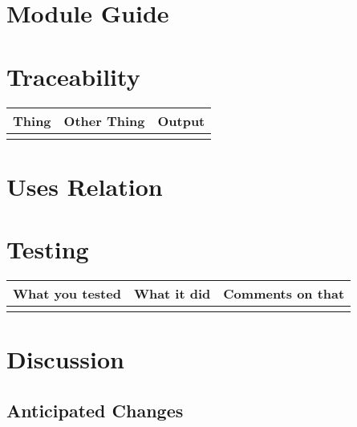 \documentclass[12pt]{article}
\begin{document}
		\section{Module Guide}
		\section{Traceability}
		\begin{tabular}{|c|c|c|}
			Thing & Other Thing & Output \\
			\hline \\
			
		\end{tabular}
		\section{Uses Relation}
		
		\section{Testing}
		\begin{tabular}{|c|c|c|}
			What you tested & What it did & Comments on that \\
			\hline \\
			
		\end{tabular}
			
		\section{Discussion}
		\subsection{Anticipated Changes}
		
	
\end{document}

